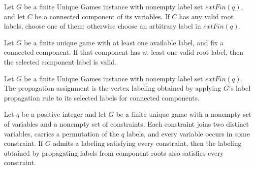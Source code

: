 \begin{definition}
\label{FABL.FiniteUniqueGame.optimalComponentLabels}
\leanok
{}
Let $G$ be a finite Unique Games instance with nonempty label set $	ext{Fin}(q)$, and
let $C$ be a connected component of its variables. If $C$ has any valid root labels,
choose one of them; otherwise choose an arbitrary label in $	ext{Fin}(q)$.
\end{definition}

\begin{theorem}
\label{FABL.FiniteUniqueGame.optimalComponentLabels_valid}
\leanok
{}
Let $G$ be a finite unique game with at least one available label, and fix a connected
component. If that component has at least one valid root label, then the selected
component label is valid.
\end{theorem}

\begin{definition}
\label{FABL.FiniteUniqueGame.propagationAssignment}
\leanok
{}
Let $G$ be a finite Unique Games instance with nonempty label set $	ext{Fin}(q)$. The
propagation assignment is the vertex labeling obtained by applying $G$'s label
propagation rule to its selected labels for connected components.
\end{definition}

\begin{theorem}
\label{FABL.FiniteUniqueGame.propagationAssignment_fullySatisfied}
\leanok
{}
Let $q$ be a positive integer and let $G$ be a finite unique game with a nonempty set of
variables and a nonempty set of constraints. Each constraint joins two distinct
variables, carries a permutation of the $q$ labels, and every variable occurs in some
constraint. If $G$ admits a labeling satisfying every constraint, then the labeling
obtained by propagating labels from component roots also satisfies every constraint.
\end{theorem}

